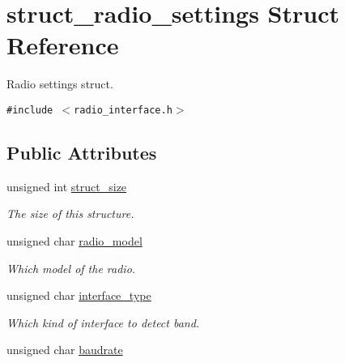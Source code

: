 \hypertarget{structstruct__radio__settings}{
\section{struct\_\-radio\_\-settings Struct Reference}
\label{structstruct__radio__settings}
}
Radio settings struct.  


{\tt \#include $<$radio\_\-interface.h$>$}

\subsection*{Public Attributes}
\begin{CompactItemize}
\item 
\hypertarget{structstruct__radio__settings_87eeaccaf3965968e5bf4b85901904ea}{
unsigned int \hyperlink{structstruct__radio__settings_87eeaccaf3965968e5bf4b85901904ea}{struct\_\-size}}
\label{structstruct__radio__settings_87eeaccaf3965968e5bf4b85901904ea}

\begin{CompactList}\small\item\em The size of this structure. \item\end{CompactList}\item 
\hypertarget{structstruct__radio__settings_5d88b0f0af0c087cb90522fe7f11c6ac}{
unsigned char \hyperlink{structstruct__radio__settings_5d88b0f0af0c087cb90522fe7f11c6ac}{radio\_\-model}}
\label{structstruct__radio__settings_5d88b0f0af0c087cb90522fe7f11c6ac}

\begin{CompactList}\small\item\em Which model of the radio. \item\end{CompactList}\item 
\hypertarget{structstruct__radio__settings_6e0238efccc99c3ad461aa210cab426e}{
unsigned char \hyperlink{structstruct__radio__settings_6e0238efccc99c3ad461aa210cab426e}{interface\_\-type}}
\label{structstruct__radio__settings_6e0238efccc99c3ad461aa210cab426e}

\begin{CompactList}\small\item\em Which kind of interface to detect band. \item\end{CompactList}\item 
\hypertarget{structstruct__radio__settings_21d4d054badff5e679aea63279b56f65}{
unsigned char \hyperlink{structstruct__radio__settings_21d4d054badff5e679aea63279b56f65}{baudrate}}
\label{structstruct__radio__settings_21d4d054badff5e679aea63279b56f65}


\end{CompactItemize}
